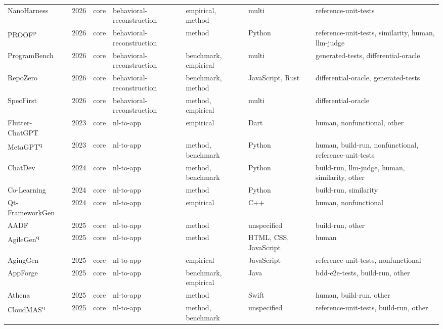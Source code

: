{\begin{longtable}{@{}p{2.8cm}lllp{1.9cm}p{1.5cm}p{2.9cm}@{}}
NanoHarness~\cite{NanoHarness2026} & 2026 & core & behavioral-reconstruction & empirical, method & multi & reference-unit-tests \\
PROOF\textsuperscript{p}~\cite{PROOF2026} & 2026 & core & behavioral-reconstruction & method & Python & reference-unit-tests, similarity, human, llm-judge \\
ProgramBench~\cite{ProgramBench2026} & 2026 & core & behavioral-reconstruction & benchmark, empirical & multi & generated-tests, differential-oracle \\
RepoZero~\cite{RepoZero2026} & 2026 & core & behavioral-reconstruction & benchmark, method & JavaScript, Rust & differential-oracle, generated-tests \\
SpecFirst~\cite{SpecFirst2026} & 2026 & core & behavioral-reconstruction & method, empirical & multi & differential-oracle \\
Flutter-ChatGPT~\cite{FlutterChatGPT2023} & 2023 & core & nl-to-app & empirical & Dart & human, nonfunctional, other \\
MetaGPT\textsuperscript{q}~\cite{MetaGPT2023} & 2023 & core & nl-to-app & method, benchmark & Python & human, build-run, nonfunctional, reference-unit-tests \\
ChatDev~\cite{ChatDev2024} & 2024 & core & nl-to-app & method, benchmark & Python & build-run, llm-judge, human, similarity, other \\
Co-Learning~\cite{CoLearning2024} & 2024 & core & nl-to-app & method & Python & build-run, similarity \\
Qt-FrameworkGen~\cite{QtFrameworkGen2024} & 2024 & core & nl-to-app & empirical & C++ & human, nonfunctional \\
AADF~\cite{AADF2025} & 2025 & core & nl-to-app & method & unspecified & build-run, other \\
AgileGen\textsuperscript{q}~\cite{AgileGen2025} & 2025 & core & nl-to-app & method & HTML, CSS, JavaScript & human \\
AgingGen~\cite{AgingGen2025} & 2025 & core & nl-to-app & empirical & JavaScript & reference-unit-tests, nonfunctional \\
AppForge~\cite{AppForge2025} & 2025 & core & nl-to-app & benchmark, empirical & Java & bdd-e2e-tests, build-run, other \\
Athena~\cite{Athena2025} & 2025 & core & nl-to-app & method & Swift & human, build-run, other \\
CloudMAS\textsuperscript{q}~\cite{CloudMAS2025} & 2025 & core & nl-to-app & method, benchmark & unspecified & reference-unit-tests, build-run, other \\

\end{longtable}}
